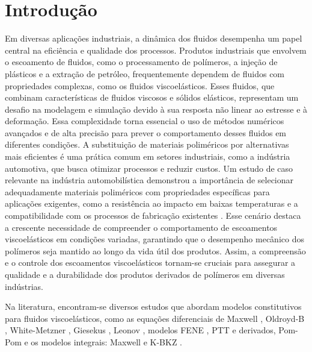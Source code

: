 \chapter[Introdução]{Introdução}
\label{Cap_Introducao}

Em diversas aplicações industriais, a dinâmica dos fluidos desempenha um papel central na eficiência e qualidade dos processos. Produtos industriais que envolvem o escoamento de fluidos, como o processamento de polímeros, a injeção de plásticos e a extração de petróleo, frequentemente dependem de fluidos com propriedades complexas, como os fluidos viscoelásticos. Esses fluidos, que combinam características de fluidos viscosos e sólidos elásticos, representam um desafio na modelagem e simulação devido à sua resposta não linear ao estresse e à deformação. Essa complexidade torna essencial o uso de métodos numéricos avançados e de alta precisão para prever o comportamento desses fluidos em diferentes condições. A substituição de materiais poliméricos por alternativas mais eficientes é uma prática comum em setores industriais, como a indústria automotiva, que busca otimizar processos e reduzir custos. Um estudo de caso relevante na indústria automobilística demonstrou a importância de selecionar adequadamente materiais poliméricos com propriedades específicas para aplicações exigentes, como a resistência ao impacto em baixas temperaturas e a compatibilidade com os processos de fabricação existentes \cite{bissoto2006substituiccao}. Esse cenário destaca a crescente necessidade de compreender o comportamento de escoamentos viscoelásticos em condições variadas, garantindo que o desempenho mecânico dos polímeros seja mantido ao longo da vida útil dos produtos. Assim, a compreensão e o controle dos escoamentos viscoelásticos tornam-se cruciais para assegurar a qualidade e a durabilidade dos produtos derivados de polímeros em diversas indústrias.

Na literatura, encontram-se diversos estudos que abordam modelos constitutivos para fluidos viscoelásticos, como as equações diferenciais de Maxwell \cite{beris1987spectral,mompean97}, Oldroyd-B \cite{brasseur1998time,mompean97,phillips2002,pinho2003}, White-Metzner \cite{White63}, Giesekus \cite{giesekus1962, giesekus1982, giesekus1985}, Leonov \cite{Leonov76}, modelos FENE \cite{Bird80,Bird83,christiansen77,Stevenson71,Warner72}, PTT \cite{phan-thien77,pinho2003} e derivados, Pom-Pom \cite{Larson88} e os modelos integrais: Maxwell \cite{Kaye62} e K-BKZ \cite{luo88}. 

